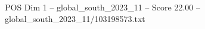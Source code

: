\begin{textsample}{POS Dim 1 – global\_south\_2023\_11 – Score 22.00 – global\_south\_2023\_11/103198573.txt}
\end{textsample}
